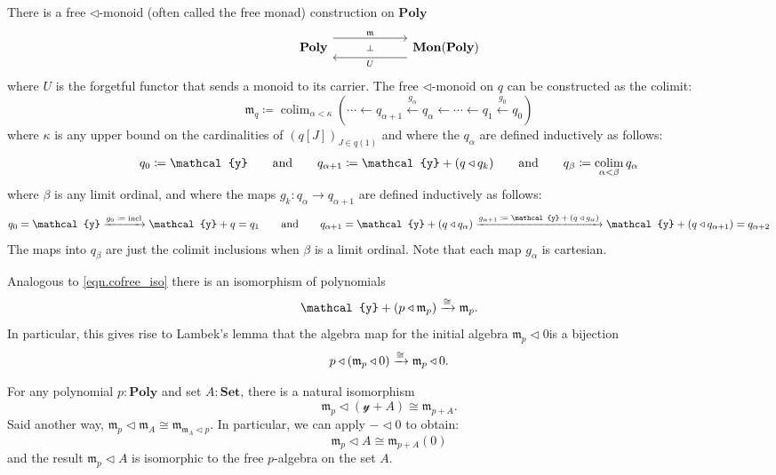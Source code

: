 \documentclass[11pt, one side, article]{memoir}
\theoremstyle{definition}
\theoremstyle{plain}
\DeclareMathOperator*{\colim}{colim}
\newcommand{\Cat}[1]{\mathbf{#1}}%
\newcommand{\To}[2][]{\xrightarrow[#1]{\tn{$#2$}}}
\newcommand{\from}{\leftarrow}
\newcommand{\From}[1]{\xleftarrow{#1}}
\newcommand{\tn}[1]{\textnormal{#1}}
\newcommand{\smset}{\Cat{Set}}
\newcommand{\yon}{{\mathcal{y}}}
\newcommand{\poly}{\Cat{Poly}}
\newcommand{\0}{\textsf{0}}
\newcommand{\1}{\tn{\textsf{1}}}
\newcommand{\tri}{\mathbin{\triangleleft}}
\newcommand{\free}{\mathfrak{m}}
\newcommand{\hh}[2][]{#1 \tn{#2} #1}
\newcommand{\qqand}{\hh[\qquad]{and}}
\begin{document}
There is a free $\tri$-monoid (often called the free monad) construction on $\poly$
\begin{equation}\label{eqn.free_monad}
\begin{tikzcd}[column sep=60pt]
	\poly
  	\ar[from=r, shift left=8pt, "U"]
		\ar[from=r, phantom, "\scriptstyle\bot"]
  	&
	\Cat{Mon}(\poly)
		\ar[from=l, shift right=-8pt, "\free"]
\end{tikzcd}
\end{equation}
where $U$ is the forgetful functor that sends a monoid to its carrier. 
The free $\tri$-monoid on $q$ can be constructed as the colimit:
\begin{equation}
	\free_q\coloneqq\colim_{\alpha<\kappa}(\cdots\from q_{\alpha+1}\From{g_\alpha}q_\alpha\from\cdots\from q_1\From{g_0} q_0)
\end{equation}
where $\kappa$ is any upper bound on the cardinalities of $(q[J])_{J\in q(1)}$ and where the $q_\alpha$ are defined inductively as follows:
\begin{equation}
	q_0\coloneqq \yon
	\qqand
	q_{\alpha+1}\coloneqq \yon+(q\tri q_k)
	\qqand
	q_\beta\coloneqq\colim_{\alpha<\beta}q_\alpha
\end{equation}
where $\beta$ is any limit ordinal, and where the maps $g_k\colon q_{\alpha}\to q_{\alpha+1}$ are defined inductively as follows:
\begin{equation}
	q_0=\yon
	\To{g_0\coloneqq\tn{incl}}\yon+q=q_1
	\qqand
	q_{\alpha+1}=\yon+(q\tri q_{\alpha})
	\To{g_{\alpha+1}\coloneqq\yon+(q\tri g_\alpha)}\yon+(q\tri q_{\alpha+1})=q_{\alpha+2}
\end{equation}
The maps into $q_\beta$ are just the colimit inclusions when $\beta$ is a limit ordinal. Note that each map $g_\alpha$ is cartesian. 

Analogous to \cref{eqn.cofree_iso} there is an isomorphism of polynomials
\begin{equation}
	 \yon+(p\tri\free_p)\To{\cong}\free_p.
	\end{equation}
In particular, this gives rise to Lambek's lemma that the algebra map for the initial algebra $\free_p\tri 0$is a bijection
\begin{equation}
		p\tri(\free_p\tri 0)\To\cong\free_p\tri0.
\end{equation}

For any polynomial $p:\poly$ and set $A:\smset$, there is a natural isomorphism
\begin{equation}
  \free_p\tri(\yon+A)
  \cong
	\free_{p+A}.  
\end{equation}
Said another way, $\free_p\tri\free_A\cong\free_{\free_A\tri p}$. In particular, we can apply $-\tri 0$ to obtain:
\begin{equation}
	\free_p\tri A\cong\free_{p+A}(0)
\end{equation}
and the result $\free_p\tri A$ is isomorphic to the free $p$-algebra on the set $A$.
\end{document}
